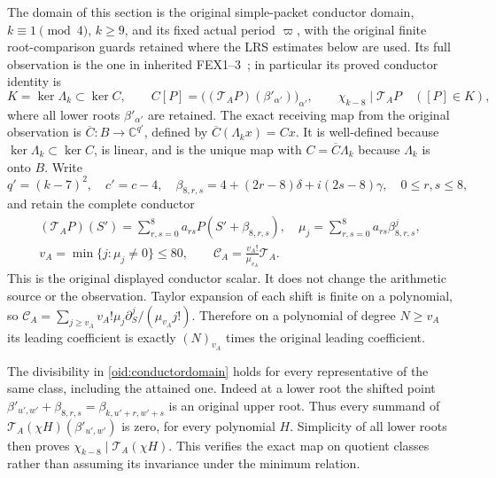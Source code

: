 \documentclass[11pt,a4paper]{article}
\newcommand{\C}{\mathbb C}
\begin{document}
The domain of this section is the original simple-packet conductor
domain, $k\equiv1\pmod4$, $k\ge9$, and its fixed actual period
$\varpi$, with the original finite root-comparison guards retained
where the LRS estimates below are used. Its full observation is the
one in inherited FEX1--3~\cite{InheritedFEX}; in particular its
proved conductor identity is
\begin{equation}\label{oid:conductordomain}
 K=\ker\Lambda_k\subset\ker C,
 \qquad C[P]=\bigl((\mathcal T_AP)(\beta'_{\alpha'})\bigr)_{\alpha'},
 \qquad \chi_{k-8}\mid\mathcal T_AP\quad([P]\in K),
\end{equation}
where all lower roots $\beta'_{\alpha'}$ are retained.
The exact receiving map from the original observation is
$\overline C:B\to\C^{q'}$, defined by
$\overline C(\Lambda_kx)=Cx$. It is well-defined because
$\ker\Lambda_k\subset\ker C$, is linear, and is the unique map
with $C=\overline C\Lambda_k$ because $\Lambda_k$ is onto $B$.
Write
\[
 q'=(k-7)^2,\quad c'=c-4,\quad
 \beta_{8,r,s}=4+(2r-8)\delta+i(2s-8)\gamma,
 \quad 0\le r,s\le8,
\]
and retain the complete conductor
\begin{equation}\label{oid:conductoroperator}
 \begin{gathered}
 (\mathcal T_AP)(S')=\sum_{r,s=0}^8a_{rs}P(S'+\beta_{8,r,s}),
 \quad \mu_j=\sum_{r,s=0}^8a_{rs}\beta_{8,r,s}^j,\\
 v_A=\min\{j:\mu_j\ne0\}\le80,
 \qquad \mathcal C_A=\frac{v_A!}{\mu_{v_A}}\mathcal T_A.
 \end{gathered}
\end{equation}
This is the original displayed conductor scalar. It does not change
the arithmetic source or the observation. Taylor expansion of each
shift is finite on a polynomial, so
$\mathcal C_A=\sum_{j\ge v_A}v_A!\mu_j
\partial_S^j/(\mu_{v_A}j!)$. Therefore on a polynomial of degree
$N\ge v_A$ its leading coefficient is exactly $(N)_{v_A}$ times
the original leading coefficient.

The divisibility in \eqref{oid:conductordomain} holds for every
representative of the same class, including the attained one.
Indeed at a lower root the shifted point
$\beta'_{u',w'}+\beta_{8,r,s}=\beta_{k,u'+r,w'+s}$ is an original
upper root. Thus every summand of
$\mathcal T_A(\chi H)(\beta'_{u',w'})$ is zero, for every polynomial
$H$. Simplicity of all lower roots then proves
$\chi_{k-8}\mid\mathcal T_A(\chi H)$. This verifies the exact map
on quotient classes rather than assuming its invariance under the
minimum relation.
\end{document}

